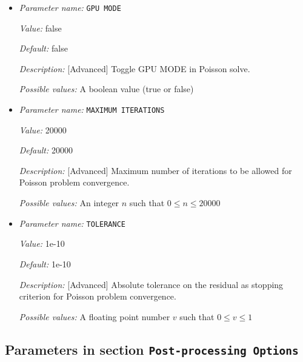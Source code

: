 \begin{itemize}
\item {\it Parameter name:} {\tt GPU MODE}
\label{parameters:Poisson problem parameters/GPU MODE}
\label{parameters:Poisson_20problem_20parameters/GPU_20MODE}


{\it Value:} false


{\it Default:} false


{\it Description:} [Advanced] Toggle GPU MODE in Poisson solve.


{\it Possible values:} A boolean value (true or false)
\item {\it Parameter name:} {\tt MAXIMUM ITERATIONS}
\label{parameters:Poisson problem parameters/MAXIMUM ITERATIONS}
\label{parameters:Poisson_20problem_20parameters/MAXIMUM_20ITERATIONS}


{\it Value:} 20000


{\it Default:} 20000


{\it Description:} [Advanced] Maximum number of iterations to be allowed for Poisson problem convergence.


{\it Possible values:} An integer $n$ such that $0\leq n \leq 20000$
\item {\it Parameter name:} {\tt TOLERANCE}
\label{parameters:Poisson problem parameters/TOLERANCE}
\label{parameters:Poisson_20problem_20parameters/TOLERANCE}


{\it Value:} 1e-10


{\it Default:} 1e-10


{\it Description:} [Advanced] Absolute tolerance on the residual as stopping criterion for Poisson problem convergence.


{\it Possible values:} A floating point number $v$ such that $0 \leq v \leq 1$
\end{itemize}

\subsection{Parameters in section \tt Post-processing Options}
\label{parameters:Post_2dprocessing_20Options}

